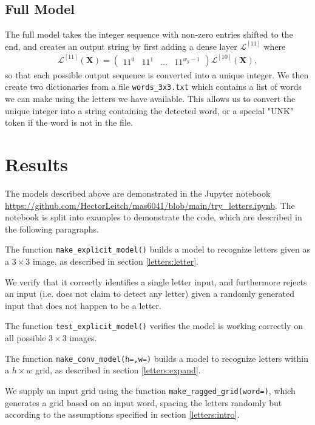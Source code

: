 \documentclass{somasmsc}
\begin{document}
\subsection{Full Model}\label{letters:full}

The full model takes the integer sequence with non-zero entries shifted to the end, and creates an output string by first adding a dense layer $\mathcal{L}^{\left[11\right]}$ where
\begin{align*}
    \mathcal{L}^{\left[11\right]}\left(\mathbf{X}\right) =
    \begin{pmatrix}
        11^0 & 11^1 & \dots & 11^{w_g - 1}
    \end{pmatrix}
    \mathcal{L}^{\left[10\right]}\left(\mathbf{X}\right),
\end{align*}
so that each possible output sequence is converted into a unique integer. We then create two dictionaries from a file \verb|words_3x3.txt| which contains a list of words we can make using the letters we have available. This allows us to convert the unique integer into a string containing the detected word, or a special "UNK" token if the word is not in the file.

\section{Results}

The models described above are demonstrated in the Jupyter notebook \url{https://github.com/HectorLeitch/mas6041/blob/main/try_letters.ipynb}. The notebook is split into examples to demonstrate the code, which are described in the following paragraphs.

\begin{exa}
The function \verb|make_explicit_model()| builds a model to recognize letters given as a $3 \times 3$ image, as described in section \ref{letters:letter}.

We verify that it correctly identifies a single letter input, and furthermore rejects an input (i.e. does not claim to detect any letter) given a randomly generated input that does not happen to be a letter.

The function \verb|test_explicit_model()| verifies the model is working correctly on all possible $3 \times 3$ images.
\end{exa}

\begin{exa}
The function \verb|make_conv_model(h=,w=)| builds a model to recognize letters within a $h \times w$ grid, as described in section \ref{letters:expand}.

We supply an input grid using the function \verb|make_ragged_grid(word=)|, which generates a grid based on an input word, spacing the letters randomly but according to the assumptions specified in section \ref{letters:intro}.
\end{exa}
\end{document}
